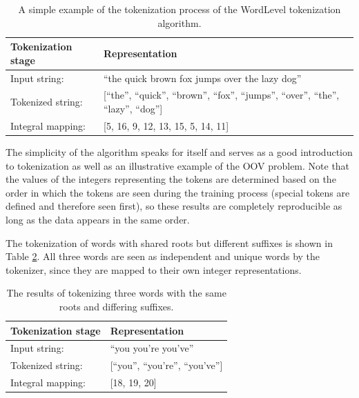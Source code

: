 \documentclass[12pt]{article}
\begin{document}
\begin{table}[!t]
    \centering
    \begin{tabular}{l l}
        \toprule
        Tokenization stage & Representation                                                                            \\
        \midrule
        Input string:      & ``the quick brown fox jumps over the lazy dog''                                           \\
        Tokenized string:  & [``the'', ``quick'', ``brown'', ``fox'', ``jumps'', ``over'', ``the'', ``lazy'', ``dog''] \\
        Integral mapping:  & [5, 16, 9, 12, 13, 15, 5, 14, 11]                                                         \\
        \bottomrule
    \end{tabular}
    \caption{A simple example of the tokenization process of the WordLevel tokenization algorithm.}
    \label{tab:wordlevel_tokenization_example}
\end{table}

The simplicity of the algorithm speaks for itself and serves as a good introduction to tokenization as well as an illustrative example of the OOV
problem. Note that the values of the integers representing the tokens are determined based on the order in which the tokens are seen during the
training process (special tokens are defined and therefore seen first), so these results are completely reproducible as long as the data appears in
the same order.

The tokenization of words with shared roots but different suffixes is shown in Table \ref{tab:wordlevel_tokenization_shared_roots_example}. All three
words are seen as independent and unique words by the tokenizer, since they are mapped to their own integer representations.

\begin{table}[!t]
    \centering
    \begin{tabular}{l l}
        \toprule
        Tokenization stage & Representation                    \\
        \midrule
        Input string:      & ``you you're you've''             \\
        Tokenized string:  & [``you'', ``you're'', ``you've''] \\
        Integral mapping:  & [18, 19, 20]                      \\
        \bottomrule
    \end{tabular}
    \caption{The results of tokenizing three words with the same roots and differing suffixes.}
    \label{tab:wordlevel_tokenization_shared_roots_example}
\end{table}
\end{document}
